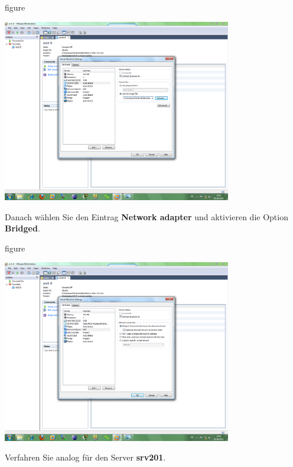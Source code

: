\begin{nofloat}{figure}
\begin{center}
\includegraphics[width=0.75\textwidth]{screenshots/vm09.png}
\end{center}
\end{nofloat}

Danach wählen Sie den Eintrag \textbf{Network adapter} und aktivieren die Option
\textbf{Bridged}.

\begin{nofloat}{figure}
\begin{center}
\includegraphics[width=0.75\textwidth]{screenshots/vm10.png}
\end{center}
\end{nofloat}

Verfahren Sie analog für den Server \textbf{srv201}.

